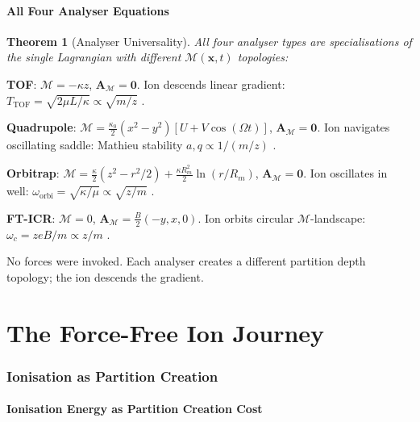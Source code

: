 \documentclass[11pt,twocolumn,a4paper]{article}
\newtheorem{theorem}{Theorem}[section]
\theoremstyle{definition}
\theoremstyle{remark}
\newcommand{\Depth}{\mathcal{M}}
\newcommand{\partinert}{\mu}
\newcommand{\Apartition}{\mathbf{A}_{\mathcal{M}}}
\begin{document}
\subsection{All Four Analyser Equations}

\begin{theorem}[Analyser Universality]
\label{thm:analyzers}
All four analyser types are specialisations of the single Lagrangian with different $\Depth(\mathbf{x},t)$ topologies:
\end{theorem}

\textbf{TOF}: $\Depth = -\kappa z$, $\Apartition = \mathbf{0}$. Ion descends linear gradient: $T_{\mathrm{TOF}} = \sqrt{2\partinert L/\kappa} \propto \sqrt{m/z}$ \citep{wiley1955}.

\textbf{Quadrupole}: $\Depth = \frac{\kappa_0}{2}(x^2-y^2)[U + V\cos(\Omega t)]$, $\Apartition = \mathbf{0}$. Ion navigates oscillating saddle: Mathieu stability $a,q \propto 1/(m/z)$ \citep{paul1990, march2005}.

\textbf{Orbitrap}: $\Depth = \frac{\kappa}{2}(z^2 - r^2/2) + \frac{\kappa R_m^2}{2}\ln(r/R_m)$, $\Apartition = \mathbf{0}$. Ion oscillates in well: $\omega_{\mathrm{orbi}} = \sqrt{\kappa/\partinert} \propto \sqrt{z/m}$ \citep{makarov2000}.

\textbf{FT-ICR}: $\Depth = 0$, $\Apartition = \frac{B}{2}(-y,x,0)$. Ion orbits circular $\Depth$-landscape: $\omega_c = zeB/m \propto z/m$ \citep{marshall1998}.

No forces were invoked. Each analyser creates a different partition depth topology; the ion descends the gradient.


\part{The Force-Free Ion Journey}

\section{Ionisation as Partition Creation}
\label{sec:ionisation}

\subsection{Ionisation Energy as Partition Creation Cost}
\end{document}
